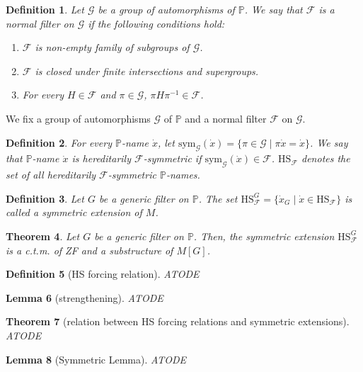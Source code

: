 \documentclass{report}
\newtheorem{thm}{Theorem}[chapter]
\newtheorem{lem}[thm]{Lemma}
\newtheorem{dfn}[thm]{Definition}
\newcommand{\Pbb}{\mathbb{P}}
\newcommand{\Gcal}{\mathcal{G}}
\newcommand{\Fcal}{\mathcal{F}}
\begin{document}
\begin{dfn} %
  Let $\Gcal$ be a group of automorphisms of $\Pbb$. We say that $\Fcal$ is a \emph{normal filter} on $\Gcal$ if the following conditions hold:
  \begin{enumerate}
    \item $\Fcal$ is non-empty family of subgroups of $\Gcal$.
    \item $\Fcal$ is closed under finite intersections and supergroups.
    \item For every $H \in \Fcal$ and $\pi \in \Gcal$, $\pi H \pi^{-1} \in \Fcal$.
  \end{enumerate}
\end{dfn}

We fix a group of automorphisms $\Gcal$ of $\Pbb$ and a normal filter $\Fcal$ on $\Gcal$.
\begin{dfn} 
  For every $\Pbb$-name $\dot{x}$, let $\text{sym}_{\Gcal}(\dot{x}) = \{ \pi \in \Gcal \mid \pi \dot{x} = \dot{x} \}$.
  We say that $\Pbb$-name $\dot{x}$ is \emph{hereditarily $\Fcal$-symmetric} if $\text{sym}_{\Gcal}(\dot{x}) \in \Fcal$.
  $\text{HS}_{\Fcal}$ denotes the set of all hereditarily $\Fcal$-symmetric $\Pbb$-names.
\end{dfn}

\begin{dfn} 
  Let $G$ be a generic filter on $\Pbb$. The set $\text{HS}^{G}_{\Fcal} = \{ \dot{x}_G \mid \dot{x} \in \text{HS}_{\Fcal} \}$ is called a \emph{symmetric extension} of $M$.
\end{dfn}

\begin{thm}
  Let $G$ be a generic filter on $\Pbb$. Then, the symmetric extension $\text{HS}^{G}_{\Fcal}$ is a c.t.m. of ZF and a substructure of $M[G]$.
\end{thm}

\begin{dfn} [HS forcing relation]
  ATODE
\end{dfn}

\begin{lem}[strengthening]
  ATODE
\end{lem}

\begin{thm} [relation between HS forcing relations and symmetric extensions]
  ATODE
\end{thm}

\begin{lem} [Symmetric Lemma]
  ATODE
\end{lem}
\end{document}
